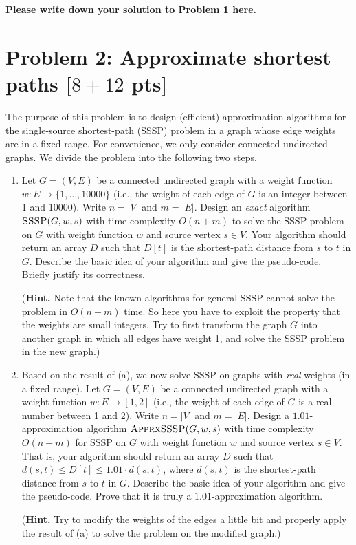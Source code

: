 \documentclass[letterpaper, 11pt]{article}
\newcommand{\1}{\mathds{1}}	%
\theoremstyle{definition}
\newcommand{\problem}[1]{\section*{Problem #1}}
\newenvironment{solution}{{\par\noindent\it Solution.}}{}
\begin{document}
\begin{solution}
\textbf{Please write down your solution to Problem 1 here.}
\end{solution}
\clearpage

\problem{2: Approximate shortest paths [$8+12$ pts]}
The purpose of this problem is to design (efficient) approximation algorithms for the single-source shortest-path (SSSP) problem in a graph whose edge weights are in a fixed range.
For convenience, we only consider connected undirected graphs.
We divide the problem into the following two steps.
\begin{enumerate}
    \item Let $G = (V,E)$ be a connected undirected graph with a weight function $w:E \rightarrow \{1,\dots,10000\}$ (i.e., the weight of each edge of $G$ is an integer between 1 and 10000). 
    Write $n = |V|$ and $m = |E|$.
    Design an \textit{exact} algorithm $\textsc{SSSP}(G,w,s)$ with time complexity $O(n+m)$ to solve the SSSP problem on $G$ with weight function $w$ and source vertex $s \in V$.
    Your algorithm should return an array $D$ such that $D[t]$ is the shortest-path distance from $s$ to $t$ in $G$.
    Describe the basic idea of your algorithm and give the pseudo-code.
    Briefly justify its correctness.

    (\textbf{Hint.} Note that the known algorithms for general SSSP cannot solve the problem in $O(n+m)$ time.
    So here you have to exploit the property that the weights are small integers.
    Try to first transform the graph $G$ into another graph in which all edges have weight 1, and solve the SSSP problem in the new graph.)
    
    \item Based on the result of (a), we now solve SSSP on graphs with \textit{real} weights (in a fixed range).
    Let $G = (V,E)$ be a connected undirected graph with a weight function $w:E \rightarrow [1,2]$ (i.e., the weight of each edge of $G$ is a real number between 1 and 2). 
    Write $n = |V|$ and $m = |E|$.
    Design a $1.01$-approximation algorithm $\textsc{ApprxSSSP}(G,w,s)$ with time complexity $O(n+m)$ for SSSP on $G$ with weight function $w$ and source vertex $s \in V$.
    That is, your algorithm should return an array $D$ such that $d(s,t) \leq D[t] \leq 1.01 \cdot d(s,t)$, where $d(s,t)$ is the shortest-path distance from $s$ to $t$ in $G$.
    Describe the basic idea of your algorithm and give the pseudo-code.
    Prove that it is truly a $1.01$-approximation algorithm.
    
    (\textbf{Hint.} Try to modify the weights of the edges a little bit and properly apply the result of (a) to solve the problem on the modified graph.)
\end{enumerate}
\end{document}

